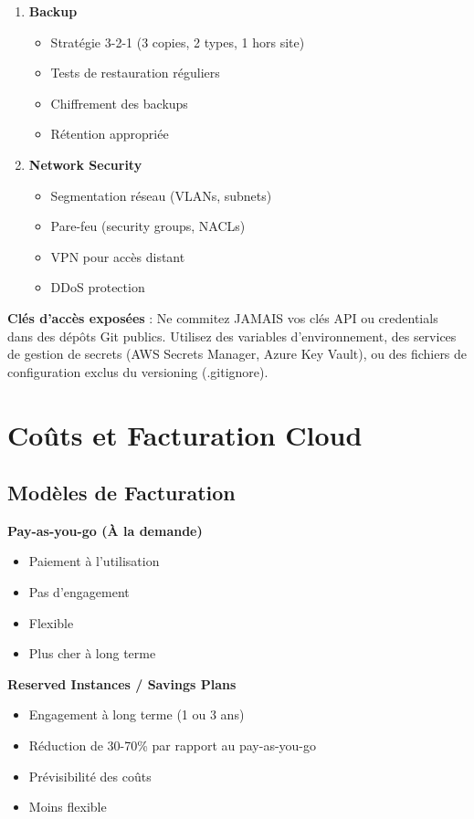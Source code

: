 \documentclass[11pt,a4paper]{article}
\begin{document}
\begin{enumerate}
    \item \textbf{Backup}
    \begin{itemize}
        \item Stratégie 3-2-1 (3 copies, 2 types, 1 hors site)
        \item Tests de restauration réguliers
        \item Chiffrement des backups
        \item Rétention appropriée
    \end{itemize}
    
    \item \textbf{Network Security}
    \begin{itemize}
        \item Segmentation réseau (VLANs, subnets)
        \item Pare-feu (security groups, NACLs)
        \item VPN pour accès distant
        \item DDoS protection
    \end{itemize}
\end{enumerate}

\begin{dangerbox}
\textbf{Clés d'accès exposées} : Ne commitez JAMAIS vos clés API ou credentials dans des dépôts Git publics. Utilisez des variables d'environnement, des services de gestion de secrets (AWS Secrets Manager, Azure Key Vault), ou des fichiers de configuration exclus du versioning (.gitignore).
\end{dangerbox}

\section{Coûts et Facturation Cloud}

\subsection{Modèles de Facturation}

\textbf{Pay-as-you-go (À la demande)}
\begin{itemize}
    \item Paiement à l'utilisation
    \item Pas d'engagement
    \item Flexible
    \item Plus cher à long terme
\end{itemize}

\textbf{Reserved Instances / Savings Plans}
\begin{itemize}
    \item Engagement à long terme (1 ou 3 ans)
    \item Réduction de 30-70\% par rapport au pay-as-you-go
    \item Prévisibilité des coûts
    \item Moins flexible
\end{itemize}
\end{document}

